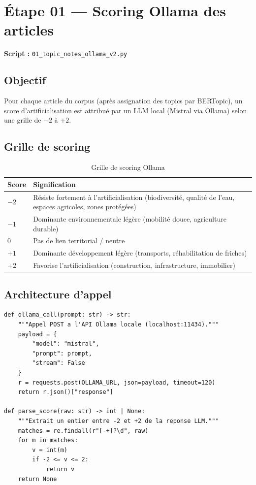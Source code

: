 \documentclass[11pt,a4paper]{report}
\newcommand{\code}[1]{\texttt{\small #1}}
\begin{document}
\section{Étape 01 — Scoring Ollama des articles}

\textbf{Script :} \code{01\_topic\_notes\_ollama\_v2.py}

\subsection{Objectif}

Pour chaque article du corpus (après assignation des topics par BERTopic), un score d'artificialisation est attribué par un LLM local (Mistral via Ollama) selon une grille de $-2$ à $+2$.

\subsection{Grille de scoring}

\begin{table}[H]
\centering
\begin{tabular}{>{\centering}p{1.5cm}p{10cm}}
\toprule
\rowcolor{seuilgris!75}
\textbf{Score} & \textbf{Signification} \\
\midrule
\rowcolor{scoreQ1!30} $-2$ & Résiste fortement à l'artificialisation (biodiversité, qualité de l'eau, espaces agricoles, zones protégées) \\
\rowcolor{scoreQ2!30} $-1$ & Dominante environnementale légère (mobilité douce, agriculture durable) \\
\rowcolor{scoreQ3!30} $0$  & Pas de lien territorial / neutre \\
\rowcolor{scoreQ4!30} $+1$ & Dominante développement légère (transports, réhabilitation de friches) \\
\rowcolor{scoreQ5!30} $+2$ & Favorise l'artificialisation (construction, infrastructure, immobilier) \\
\bottomrule
\end{tabular}
\caption{Grille de scoring Ollama}
\end{table}

\subsection{Architecture d'appel}

\begin{lstlisting}[language=Python3, caption={Appel Ollama avec parsing robuste du score}]
def ollama_call(prompt: str) -> str:
    """Appel POST a l'API Ollama locale (localhost:11434)."""
    payload = {
        "model": "mistral",
        "prompt": prompt,
        "stream": False
    }
    r = requests.post(OLLAMA_URL, json=payload, timeout=120)
    return r.json()["response"]

def parse_score(raw: str) -> int | None:
    """Extrait un entier entre -2 et +2 de la reponse LLM."""
    matches = re.findall(r"[-+]?\d", raw)
    for m in matches:
        v = int(m)
        if -2 <= v <= 2:
            return v
    return None
\end{lstlisting}
\end{document}
